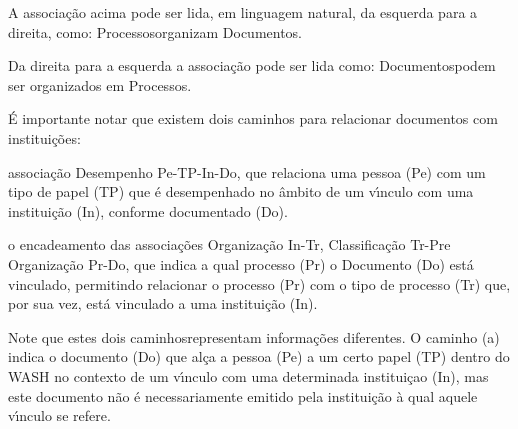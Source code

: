 \documentclass[
12pt,		%
openright,	%
twoside,  %
a4paper,			%
chapter=TITLE,		%
english,			%
french,				%
spanish,			%
brazil				%
]{USPSC-classe/USPSC}
\begin{document}
A associa\c{c}\~ao acima pode ser lida, em linguagem natural, da esquerda para a direita, como: \textquotedbl Processos\textquotedbl  organizam \textquotedbl Documentos\textquotedbl .









Da direita para a esquerda a associa\c{c}\~ao pode ser lida como: \textquotedbl Documentos\textquotedbl  podem ser organizados em \textquotedbl Processos\textquotedbl .









\'E importante notar que existem dois caminhos para relacionar documentos com institui\c{c}\~oes:










\begin{alineas}
\item associa\c{c}\~ao \textquotedbl Desempenho Pe-TP-In-Do\textquotedbl , que relaciona uma pessoa (Pe) com um tipo de papel (TP) que \'e desempenhado no \^ambito de um v\'{\i}nculo com uma institui\c{c}\~ao (In), conforme documentado 
(Do).
\item o encadeamento das associa\c{c}\~oes \textquotedbl Organiza\c{c}\~ao In-Tr\textquotedbl , \textquotedbl Classifica\c{c}\~ao Tr-Pr\textquotedbl  e \textquotedbl Organiza\c{c}\~ao Pr-Do\textquotedbl , que indica a qual processo (Pr) o Documento (Do) est\'a vinculado, permitindo relacionar o processo (Pr) com o tipo de processo (Tr) que, por sua vez, est\'a vinculado a uma institui\c{c}\~ao (In).
\end{alineas}

Note que estes dois \textquotedbl caminhos\textquotedbl  representam informa\c{c}\~oes diferentes. O caminho (a) indica o documento (Do) que al\c{c}a a pessoa (Pe) a um certo papel (TP) dentro do WASH no contexto de um v\'{\i}nculo com uma determinada institui\c{c}ao (In), mas este documento n\~ao \'e necessariamente emitido pela institui\c{c}\~ao \`a qual aquele v\'{\i}nculo se refere.
\end{document}
